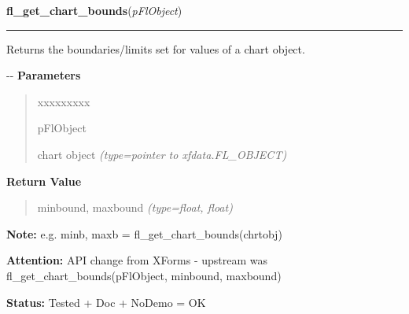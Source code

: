     \vspace{0.5ex}

\hspace{.8\funcindent}\begin{boxedminipage}{\funcwidth}

    \raggedright \textbf{fl\_get\_chart\_bounds}(\textit{pFlObject})

    \vspace{-1.5ex}

    \rule{\textwidth}{0.5\fboxrule}
\setlength{\parskip}{2ex}

Returns the boundaries/limits set for values of a chart object.

-{}-
\setlength{\parskip}{1ex}
      \textbf{Parameters}
      \vspace{-1ex}

      \begin{quote}
        \begin{Ventry}{xxxxxxxxx}

          \item[pFlObject]


chart object
            {\it (type=pointer to xfdata.FL\_OBJECT)}

        \end{Ventry}

      \end{quote}

      \textbf{Return Value}
    \vspace{-1ex}

      \begin{quote}

minbound, maxbound
      {\it (type=float, float)}

      \end{quote}

\textbf{Note:} 
e.g. minb, maxb = fl\_get\_chart\_bounds(chrtobj)


\textbf{Attention:} 
API change from XForms - upstream was
fl\_get\_chart\_bounds(pFlObject, minbound, maxbound)


\textbf{Status:} 
Tested + Doc + NoDemo = OK


    \end{boxedminipage}

    \label{xformslib:flchart:fl_set_chart_maxnumb}

    \vspace{0.5ex}

